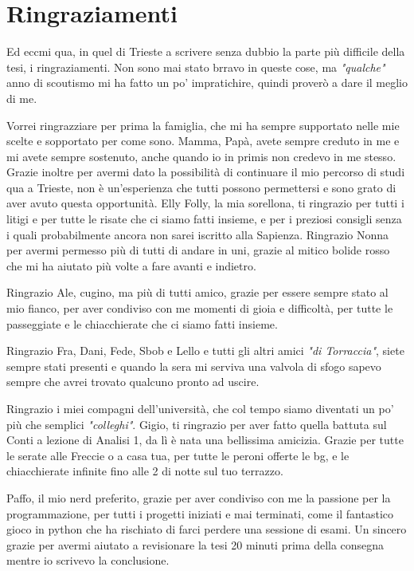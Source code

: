 \chapter*{Ringraziamenti}


Ed eccmi qua, in quel di Trieste a scrivere senza dubbio la parte più difficile della tesi, i ringraziamenti. Non sono mai stato brravo in queste cose, ma \textit{"qualche"} anno di scoutismo mi ha fatto un po' impratichire, quindi proverò a dare il meglio di me. 

Vorrei ringrazziare per prima la famiglia, che mi ha sempre supportato nelle mie scelte e sopportato per come sono. Mamma, Papà, avete sempre creduto in me e mi avete sempre sostenuto, anche quando io in primis non credevo in me stesso. Grazie inoltre per avermi dato la possibilità di continuare il mio percorso di studi qua a Trieste, non è un'esperienza che tutti possono permettersi e sono grato di aver avuto questa opportunità. Elly Folly, la mia sorellona, ti ringrazio per tutti i litigi e per tutte le risate che ci siamo fatti insieme, e per i preziosi consigli senza i quali probabilmente ancora non sarei iscritto alla Sapienza. Ringrazio Nonna per avermi permesso più di tutti di andare in uni, grazie al mitico bolide rosso che mi ha aiutato più volte a fare avanti e indietro.

Ringrazio Ale, cugino, ma più di tutti amico, grazie per essere sempre stato al mio fianco, per aver condiviso con me momenti di gioia e difficoltà, per tutte le passeggiate e le chiacchierate che ci siamo fatti insieme.

Ringrazio Fra, Dani, Fede, Sbob e Lello e tutti gli altri amici \textit{"di Torraccia"}, siete sempre stati presenti e quando la sera mi serviva una valvola di sfogo sapevo sempre che avrei trovato qualcuno pronto ad uscire.

Ringrazio i miei compagni dell'università, che col tempo siamo diventati un po' più che semplici \textit{"colleghi"}. Gigio, ti ringrazio per aver fatto quella battuta sul Conti a lezione di Analisi 1, da lì è nata una bellissima amicizia. Grazie per tutte le serate alle Freccie o a casa tua, per tutte le peroni offerte le bg, e le chiacchierate infinite fino alle 2 di notte sul tuo terrazzo.

    Paffo, il mio nerd preferito, grazie per aver condiviso con me la passione per la programmazione, per tutti i progetti iniziati e mai terminati, come il fantastico gioco in python che ha rischiato di farci perdere una sessione di esami. Un sincero grazie per avermi aiutato a revisionare la tesi 20 minuti prima della consegna mentre io scrivevo la conclusione. 

